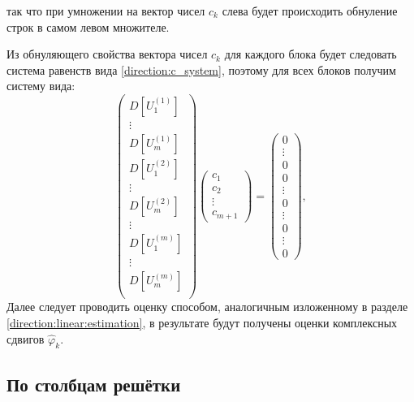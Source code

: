 так что при умножении на вектор чисел $c_k$ слева будет происходить обнуление строк в самом левом множителе.

Из обнуляющего свойства вектора чисел $c_k$ для каждого блока будет следовать система равенств вида \eqref{direction:c_system}, поэтому для всех блоков
получим систему вида:
\[
    \begin{pmatrix}
        D[U_1^{(1)}] \\
        \vdots       \\
        D[U_m^{(1)}] \\
        D[U_1^{(2)}] \\
        \vdots       \\
        D[U_m^{(2)}] \\
        \vdots       \\
        D[U_1^{(m)}] \\
        \vdots       \\
        D[U_m^{(m)}] \\
    \end{pmatrix}
    \begin{pmatrix}
        c_1    \\
        c_2    \\
        \vdots \\
        c_{m+1}
    \end{pmatrix}
    =
    \begin{pmatrix}
        0      \\
        \vdots \\
        0      \\
        0      \\
        \vdots \\
        0      \\
        \vdots \\
        0      \\
        \vdots \\
        0
    \end{pmatrix} ,
\]
Далее следует проводить оценку способом, аналогичным изложенному в разделе \ref{direction:linear:estimation}, в результате будут получены оценки комплексных
сдвигов $\widehat{\varphi}_k$.

\subsection{По столбцам решётки}

